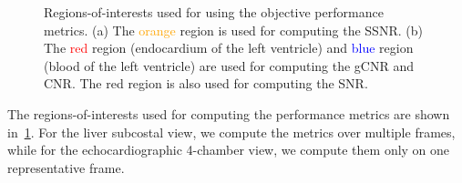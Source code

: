 %
\begin{figure}[h]
  \centering
  \caption{Regions-of-interests used for using the objective performance metrics.
    (a) The \textcolor{orange}{orange} region is used for computing the SSNR.
    (b) The \textcolor{red}{red} region (endocardium of the left ventricle) and \textcolor{blue}{blue} region (blood of the left ventricle) are used for computing the gCNR and CNR.
    The red region is also used for computing the SNR.
  }\label{fig:roi}
\end{figure}
% 
The regions-of-interests used for computing the performance metrics are shown in~\cref{fig:roi}.
For the liver subcostal view, we compute the metrics over multiple frames, while for the echocardiographic 4-chamber view, we compute them only on one representative frame.

